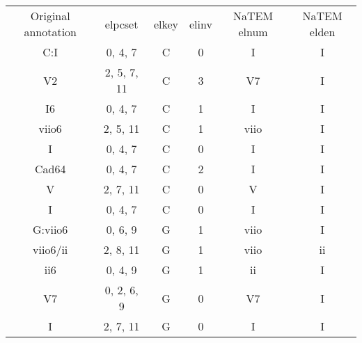\begin{tabular}{cccccc}
Original annotation & elpcset       & elkey & elinv & NaTEM elnum & NaTEM elden \\
C:I                 & {0, 4, 7}     & C     & 0     & I           & I           \\
V2                  & {2, 5, 7, 11} & C     & 3     & V7          & I           \\
I6                  & {0, 4, 7}     & C     & 1     & I           & I           \\
viio6               & {2, 5, 11}    & C     & 1     & viio        & I           \\
I                   & {0, 4, 7}     & C     & 0     & I           & I           \\
Cad64               & {0, 4, 7}     & C     & 2     & I           & I           \\
V                   & {2, 7, 11}    & C     & 0     & V           & I           \\
I                   & {0, 4, 7}     & C     & 0     & I           & I           \\
G:viio6             & {0, 6, 9}     & G     & 1     & viio        & I           \\
viio6/ii            & {2, 8, 11}    & G     & 1     & viio        & ii          \\
ii6                 & {0, 4, 9}     & G     & 1     & ii          & I           \\
V7                  & {0, 2, 6, 9}  & G     & 0     & V7          & I           \\
I                   & {2, 7, 11}    & G     & 0     & I           & I          
\end{tabular}
